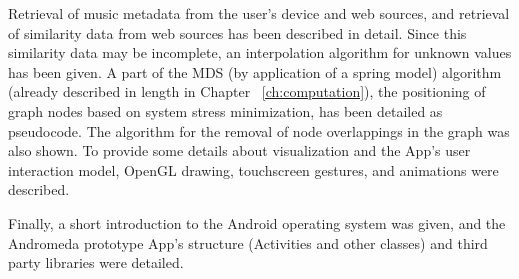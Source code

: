 Retrieval of music metadata from the user's device and web sources, and retrieval of similarity data from web sources has been described in detail. Since this similarity data may be incomplete, an interpolation algorithm for unknown values has been given.
A part of the MDS (by application of a spring model) algorithm (already described in length in Chapter ~\ref{ch:computation}), the positioning of graph nodes based on system stress minimization, has been detailed as pseudocode. The algorithm for the removal of node overlappings in the graph was also shown.
To provide some details about visualization and the App's user interaction model, OpenGL drawing, touchscreen gestures, and animations were described.

Finally, a short introduction to the Android operating system was given, and the Andromeda prototype App's structure (Activities and other classes) and third party libraries were detailed.